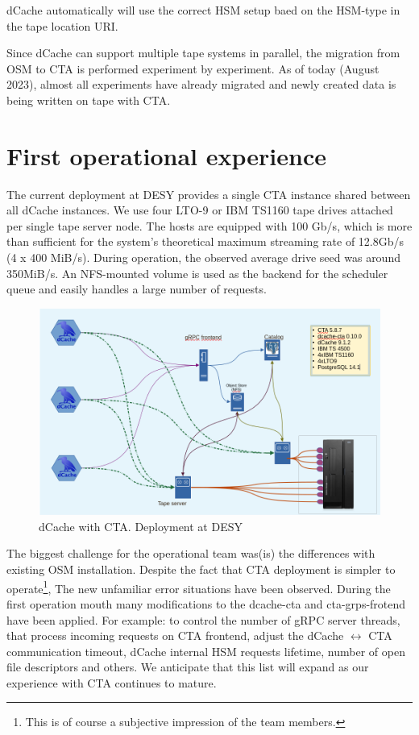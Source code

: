 \documentclass{webofc}
\begin{document}
dCache automatically will use the correct HSM setup baed on the HSM-type in the tape location URI.

Since dCache can support multiple tape systems in parallel, the migration from OSM to CTA is performed experiment by experiment. As of today (August 2023), almost all experiments have already migrated and newly created data is being written on tape with CTA.

\section{First operational experience}
\label{experence}

The current deployment at DESY provides a single CTA instance shared between all dCache instances. We use four LTO-9 or IBM TS1160 tape drives attached per single tape server node. The hosts are equipped with 100 Gb/s, which is more than sufficient for the system's theoretical maximum streaming rate of 12.8Gb/s (4 x 400 MiB/s). During operation, the observed average drive seed was around 350MiB/s.  An NFS-mounted volume is used as the backend for the scheduler queue and easily handles a large number of requests.

\begin{figure}[h]
    \centering
    \includegraphics[scale=0.30 ]{cta-deployment-desy.png}
    \caption{dCache with CTA. Deployment at DESY}
    \label{fig:dcache_cta_deplyment}
\end{figure}

The biggest challenge for the operational team was(is) the differences with existing OSM installation. Despite the fact that CTA deployment is simpler to operate\footnote{This is of course a subjective impression of the team members.}, The new unfamiliar error situations have been observed. During the first operation mouth many modifications to the dcache-cta and cta-grps-frotend have been applied. For example: to control the number of gRPC server threads, that process incoming requests on CTA frontend, adjust the dCache $\leftrightarrow$ CTA communication timeout, dCache internal HSM requests lifetime, number of open file descriptors and others. We anticipate that this list will expand as our experience with CTA continues to mature.
\end{document}
